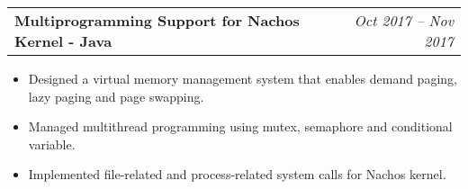 \documentclass[letterpaper,11pt]{article}
\makeatletter
\newcommand{\resumeSimpleItem}[1]{
   \item\small{
     {#1 \vspace{-2pt}}
   }
 }
\newcommand{\resumeProjectHeading}[2]{
   \vspace{-3pt}\item
     \begin{tabular*}{0.97\textwidth}{l@{\extracolsep{\fill}}r}
       \textbf{#1} &  \textit{\small #2} \\
     \end{tabular*}\vspace{-1pt}
 }
\newcommand{\resumeSimpleItem}[1]{
  \item\small{
    {#1 \vspace{-2pt}}
  }
}
\newcommand{\resumeProjectHeading}[2]{
  \vspace{-3pt}\item
    \begin{tabular*}{0.97\textwidth}{l@{\extracolsep{\fill}}r}
      \textbf{#1} &  \textit{\small #2} \\
    \end{tabular*}\vspace{-1pt}
}
\newcommand{\resumeItemListStart}{\begin{itemize}}
\newcommand{\resumeItemListEnd}{\end{itemize}\vspace{-5pt}}
\makeatother
\begin{document}
 

  
  
    
  
	 \resumeProjectHeading
       {Multiprogramming Support for Nachos Kernel - Java}{Oct 2017 -- Nov 2017}
       \resumeItemListStart
         \resumeSimpleItem{Designed a virtual memory management system that enables demand paging, lazy paging and page swapping.}
         \resumeSimpleItem{Managed multithread programming using mutex, semaphore and conditional variable.}
         \resumeSimpleItem{Implemented file-related and process-related system calls for Nachos kernel.}
       \resumeItemListEnd
    
         
\end{document}
